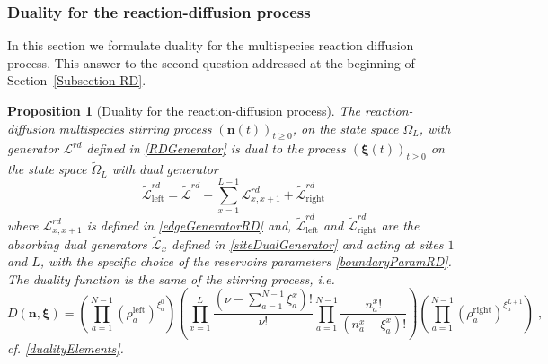 \documentclass[10pt]{article}
\numberwithin{equation}{section}
\numberwithin{equation}{subsection}
\newtheorem{proposition}{Proposition}
\newcommand{\co}{\;,}
\begin{document}
\subsubsection{Duality for the reaction-diffusion process}
In this section we formulate duality for the multispecies reaction diffusion process. This answer to the second question addressed at the beginning of Section~\ref{Subsection-RD}.
\begin{proposition}[Duality for the reaction-diffusion process]\label{propositin-duality-RD}
The reaction-diffusion multispecies stirring process $(\bm{n}(t))_{t\geq 0}$, on the state space $\Omega_{L}$, with generator $\mathcal{L}^{rd}$ defined in \eqref{RDGenerator} is dual to the process $(\bm{\xi}(t))_{t\geq 0}$ on the state space $\widetilde{\Omega}_{L}$ with dual generator
\begin{equation}\label{DualGeneratorRD}
	\widetilde{\mathcal{L}}_{\text{left}}^{rd}=\widetilde{\mathcal{L}}^{rd}+\sum_{x=1}^{L-1}\mathcal{L}_{x,x+1}^{rd}+\widetilde{\mathcal{L}}_{\text{right}}^{rd}
\end{equation}
where 
$\mathcal{L}_{x,x+1}^{rd}$ is defined in \eqref{edgeGeneratorRD} and, $\widetilde{\mathcal{L}}_{\text{left}}^{rd}$ and $\widetilde{\mathcal{L}}_{\text{right}}^{rd}$ are the absorbing dual generators $\widetilde{\mathcal{L}}_{x}$ defined in \eqref{siteDualGenerator} and acting at sites $1$ and $L$, with the specific choice of the reservoirs parameters \eqref{boundaryParamRD}. The duality function
is the same of the stirring process, i.e.
\begin{equation}
	D(\bm{n},\bm{\xi})=\left(\prod_{a=1}^{N-1}\left(\rho_{a}^{\text{left}}\right)^{\xi_{a}^{0}}\right)\left(\prod_{x=1}^{L}\frac{(\nu -\sum_{a=1}^{N-1}\xi_{a}^{x})!}{\nu!}\prod_{a=1}^{N-1}\frac{n_{a}^{x}!}{(n_{a}^{x}-\xi_{a}^{x})!}\right)\left(\prod_{a=1}^{N-1}\left(\rho_{a}^{\text{right}}\right)^{\xi_{a}^{L+1}}\right)\co
\end{equation}
cf. \eqref{dualityElements}.
\end{proposition} 
\end{document}
